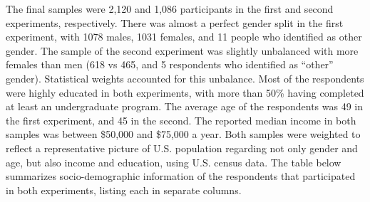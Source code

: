 \documentclass[
  12pt,
]{article}
\begin{document}
The final samples were 2,120 and 1,086 participants in the first and second experiments, respectively. There was almost a perfect gender split in the first experiment, with 1078 males, 1031 females, and 11 people who identified as other gender. The sample of the second experiment was slightly unbalanced with more females than men (618 vs 465, and 5 respondents who identified as ``other'' gender). Statistical weights accounted for this unbalance. Most of the respondents were highly educated in both experiments, with more than 50\% having completed at least an undergraduate program. The average age of the respondents was 49 in the first experiment, and 45 in the second. The reported median income in both samples was between \$50,000 and \$75,000 a year. Both samples were weighted to reflect a representative picture of U.S. population regarding not only gender and age, but also income and education, using U.S. census data. The table below summarizes socio-demographic information of the respondents that participated in both experiments, listing each in separate columns.
\end{document}
